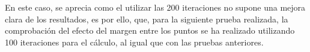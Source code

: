 \documentclass[11pt,spanish,listoffigures,listoftables]{tfgetsinf}
\makeatletter
\def\addlegendimage{\csname pgfplots@addlegendimage\endcsname}
\makeatother
\begin{document}
En este caso, se aprecia como el utilizar las 200 iteraciones no supone una mejora clara de los resultados, es por ello, que, para la siguiente prueba realizada, la comprobación del efecto del margen entre los puntos se ha realizado utilizando 100 iteraciones para el cálculo, al igual que con las pruebas anteriores.

\begin{figure}[!htb]
    \centering
\end{figure}
\end{document}
